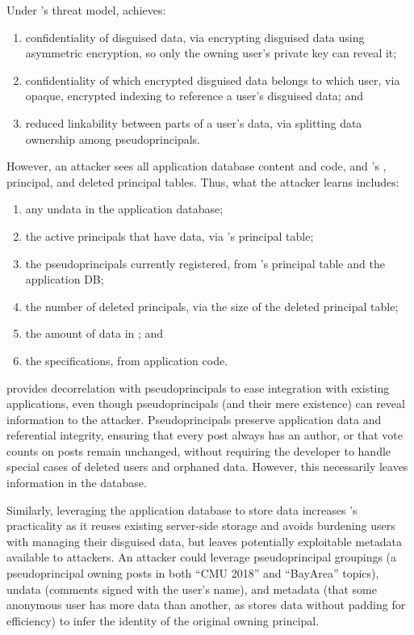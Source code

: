 %
Under \sys's threat model, \sys achieves:
\begin{enumerate}[nosep]
    \item confidentiality of disguised data, via encrypting disguised data using asymmetric encryption, so only the owning user’s private key can reveal it;
    \item confidentiality of which encrypted disguised data belongs to which
        user, via opaque, encrypted indexing to reference a user’s disguised data; and
    \item reduced linkability between parts of a user's data, via splitting data ownership among pseudoprincipals.
\end{enumerate}
%
However, an attacker sees all application database
content and code, and \sys's \xx, principal, and deleted principal tables.
%
Thus, what the attacker learns includes:
\begin{enumerate}[nosep]
  \item any un\xxed data in the application database;
  \item the active principals that have \xxed data, via \sys's principal
      table;
  \item the pseudoprincipals currently registered, from \sys's
    principal table and the application DB;
  \item the number of deleted principals, via the size of the deleted
    principal table;
  \item the amount of \xxed data in \sys; and
  \item the \xx specifications, from application code.
\end{enumerate}

%
\sys provides decorrelation with pseudoprincipals to ease integration with
existing applications, even though pseudoprincipals (and their mere existence) can
reveal information to the attacker.
%
Pseudoprincipals preserve application data and referential integrity, ensuring that
\eg every post always has an author, or that vote counts on posts remain unchanged,
without requiring the developer to handle special cases of deleted users and
orphaned data.
%
However, this necessarily leaves information in the database.
%

Similarly, leveraging the application database to store \xxed data increases \sys's
practicality as it reuses existing server-side storage and avoids burdening
users with managing their disguised data, but leaves potentially
exploitable metadata available to attackers.
%
An attacker could leverage pseudoprincipal groupings (\eg a pseudoprincipal
owning posts in both ``CMU 2018'' and ``BayArea'' topics), un\xxed data
(\eg comments signed with the user's name), and \sys metadata (\eg that some
anonymous user has more \xxed data than another, as \sys stores \xxed data without
padding for efficiency) to infer the identity of the original owning principal.

